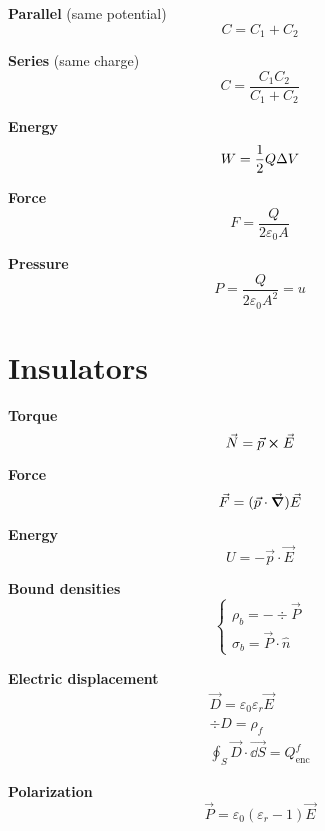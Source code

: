 \documentclass[10pt]{extarticle}
\numberwithin{equation}{section}
\begin{document}
\begin{multicols}{2}
    \textbf{Parallel} (same potential)
    \begin{equation}
        C = C_1 + C_2
    \end{equation}

    \textbf{Series} (same charge)
    \begin{equation}
        C = \frac{C_1 C_2}{C_1 + C_2}
    \end{equation}

    \textbf{Energy}
    \begin{equation}
        W = \frac{1}{2} Q \Delta V
    \end{equation}

    \textbf{Force}
    \begin{equation}
        F = \frac{Q}{2 \varepsilon_0 A}
    \end{equation}

    \textbf{Pressure}
    \begin{equation}
        P = \frac{Q}{2 \varepsilon_0 A^2} = u
    \end{equation}

    \section{Insulators}

    \textbf{Torque}
    \begin{equation}
        \vec N = \vec p \cross \vec E
    \end{equation}

    \textbf{Force}
    \begin{equation}
        \vec F = (\vec p \cdot \grad) \vec E
    \end{equation}

    \textbf{Energy}
    \begin{equation}
        U = - \vec p \cdot \vec E
    \end{equation}

    \textbf{Bound densities}
    \begin{equation}
        \begin{cases}
            \rho_b = -\div \vec P \\
            \sigma_b = \vec P \cdot \hat n
        \end{cases}
    \end{equation}

    \textbf{Electric displacement}
    \begin{gather}
        \vec D = \varepsilon_0 \varepsilon_r \vec E \\
        \div D = \rho_f \\
        \oint_S \vec D \cdot \vec{\dd S} = Q_\text{enc}^f
    \end{gather}

    \textbf{Polarization}
    \begin{equation}
        \vec P = \varepsilon_0 (\varepsilon_r-1) \vec E
    \end{equation}

\end{multicols}
\end{document}
